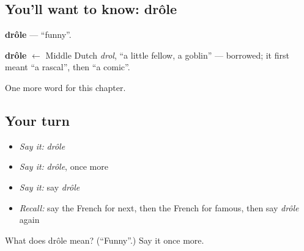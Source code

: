 \subsection*{You'll want to know: drôle}
\textbf{drôle} — \textquotedblleft{}funny\textquotedblright{}.

\begin{cousinweb}
\textbf{drôle} $\leftarrow$ Middle Dutch \emph{drol}, \textquotedblleft{}a little fellow, a goblin\textquotedblright{} — borrowed; it first meant \textquotedblleft{}a rascal\textquotedblright{}, then \textquotedblleft{}a comic\textquotedblright{}.
\end{cousinweb}

\begin{grammarlens}[title={What you've built}]
One more word for this chapter.
\end{grammarlens}

\subsection*{Your turn}
\begin{itemize}
\raggedright
  \item \emph{Say it:} \emph{drôle}
  \item \emph{Say it:} \emph{drôle}, once more
  \item \emph{Say it:} say \emph{drôle}
  \item \emph{Recall:} say the French for next, then the French for famous, then say \emph{drôle} again
\end{itemize}

\begin{tcolorbox}[breakable,colback=teal!4,colframe=teal!35!black,title={Before you move on}]
What does drôle mean? (\textquotedblleft{}Funny\textquotedblright{}.) Say it once more.
\end{tcolorbox}

